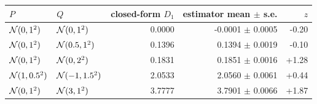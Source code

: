 \begin{tabular}{llrrr}
\toprule
$P$ & $Q$ & closed-form $D_1$ & estimator mean $\pm$ s.e. & $z$\\
\midrule
$\mathcal{N}(0,1^2)$ & $\mathcal{N}(0,1^2)$ & 0.0000 & -0.0001 $\pm$ 0.0005 & -0.20\\
$\mathcal{N}(0,1^2)$ & $\mathcal{N}(0.5,1^2)$ & 0.1396 & 0.1394 $\pm$ 0.0019 & -0.10\\
$\mathcal{N}(0,1^2)$ & $\mathcal{N}(0,2^2)$ & 0.1831 & 0.1851 $\pm$ 0.0016 & +1.28\\
$\mathcal{N}(1,0.5^2)$ & $\mathcal{N}(-1,1.5^2)$ & 2.0533 & 2.0560 $\pm$ 0.0061 & +0.44\\
$\mathcal{N}(0,1^2)$ & $\mathcal{N}(3,1^2)$ & 3.7777 & 3.7901 $\pm$ 0.0066 & +1.87\\
\bottomrule
\end{tabular}
